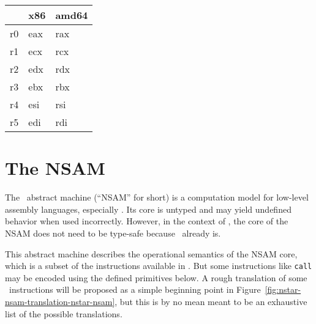 \begin{tabularx}{\textwidth}{Y Y Y}
	\toprule
	\nstar & x86 & amd64 \\
	\midrule
	r0     & eax & rax   \\
	r1     & ecx & rcx   \\
	r2     & edx & rdx   \\
	r3     & ebx & rbx   \\
	r4     & esi & rsi   \\
	r5     & edi & rdi   \\
	\bottomrule
\end{tabularx}

\chapter{The NSAM}\label{chap:nstar-nsam}


The \nstar\ abstract machine (``NSAM'' for short) is a computation model for low-level assembly languages, especially \nstar.
Its core is untyped and may yield undefined behavior when used incorrectly.
However, in the context of \nstar, the core of the NSAM does not need to be type-safe because \nstar\ already is.

This abstract machine describes the operational semantics of the NSAM core, which is a subset of the instructions available in \nstar.
But some instructions like \texttt{call} may be encoded using the defined primitives below.
A rough translation of some \nstar\ instructions will be proposed as a simple beginning point in Figure~\ref{fig:nstar-nsam-translation-nstar-nsam}, but this is by no mean meant to be an exhaustive list of the possible translations.

